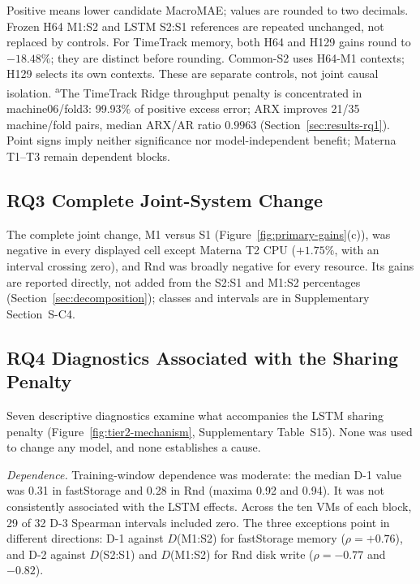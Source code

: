 \documentclass[5p,twocolumn]{elsarticle}
\begin{document}
\begin{table}[t]
\begin{tabular*}{\textwidth}{@{\extracolsep{\fill}}lrrrr@{}}
    \bottomrule
  \end{tabular*}
  \vspace{2pt}
  \parbox{\textwidth}{\footnotesize Positive means lower candidate MacroMAE; values are rounded to two decimals.
  Frozen H64 M1:S2 and LSTM S2:S1 references are repeated unchanged, not replaced by controls.
  For TimeTrack memory, both H64 and H129 gains round to $-18.48\%$; they are distinct before rounding.
  Common-S2 uses H64-M1 contexts; H129 selects its own contexts. These are separate controls, not joint causal isolation.
  \textsuperscript{a}The TimeTrack Ridge throughput penalty is concentrated in machine06/fold3:
  99.93\% of positive excess error; ARX improves 21/35 machine/fold pairs, median ARX/AR ratio $0.9963$ (Section~\ref{sec:results-rq1}).
  Point signs imply neither significance nor model-independent benefit; Materna T1--T3 remain dependent blocks.}
\end{table}

\subsection{RQ3 Complete Joint-System Change}
\label{sec:results-rq3}

The complete joint change, M1 versus S1 (Figure~\ref{fig:primary-gains}(c)),
was negative in every displayed cell except Materna T2 CPU ($+1.75\%$, with an
interval crossing zero), and Rnd was broadly negative for every resource. Its
gains are reported directly, not added from the S2:S1 and M1:S2 percentages
(Section~\ref{sec:decomposition}); classes and intervals are in Supplementary
Section~S-C4.

\subsection{RQ4 Diagnostics Associated with the Sharing Penalty}
\label{sec:results-diagnostics}

Seven descriptive diagnostics examine what accompanies the LSTM sharing
penalty (Figure~\ref{fig:tier2-mechanism}, Supplementary
Table~S15). None was used to change any model, and
none establishes a cause.

\emph{Dependence.} Training-window dependence was moderate: the median D-1
value was 0.31 in fastStorage and 0.28 in Rnd (maxima 0.92 and 0.94). It was
not consistently associated with the LSTM effects. Across the ten VMs of
each block, 29 of 32 D-3 Spearman intervals included zero. The three
exceptions point in different directions: D-1 against $D$(M1:S2) for
fastStorage memory ($\rho=+0.76$), and D-2 against $D$(S2:S1) and
$D$(M1:S2) for Rnd disk write ($\rho=-0.77$ and $-0.82$).
\end{document}

